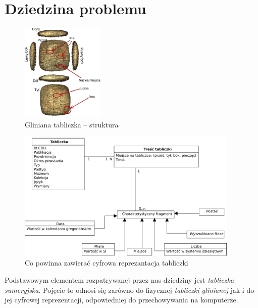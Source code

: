 \section{Dziedzina problemu}

\begin{figure}
 \centering
 \includegraphics[width=150px]{../diagramy/tabliczka.pdf}
 \caption{\label{fig:tabliczka}Gliniana tabliczka -- struktura}
\end{figure}



\begin{figure}
 \centering
 \includegraphics[width=400px]{../diagramy/Model-dziedziny.pdf}
 \caption{Co powinna zawierać cyfrowa reprezantacja tabliczki}
\end{figure}
Podstawowym elementem rozpatrywanej przez nas dziedziny jest \emph{tabliczka sumeryjska}. 
Pojęcie to odnosi się zarówno do fizycznej \emph{tabliczki glinianej} jak i do jej cyfrowej reprezentacji, 
odpowiedniej do przechowywania na komputerze. 

